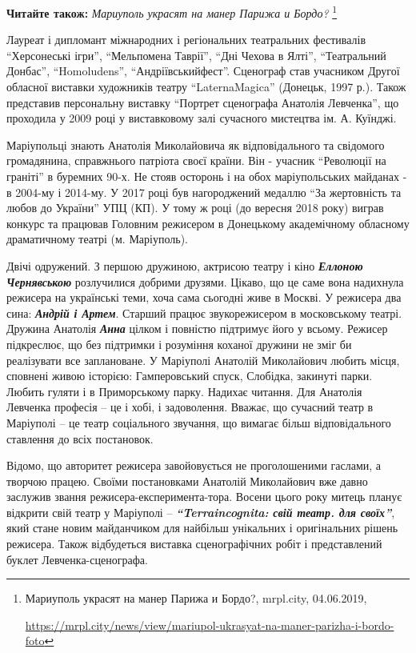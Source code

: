 \textbf{Читайте також:} \emph{Мариуполь украсят на манер Парижа и Бордо?}%
\footnote{Мариуполь украсят на манер Парижа и Бордо?, mrpl.city, 04.06.2019, \par%
\url{https://mrpl.city/news/view/mariupol-ukrasyat-na-maner-parizha-i-bordo-foto}%
}

Лауреат і дипломант міжнародних і регіональних театральних фестивалів
\enquote{Херсонеські ігри}, \enquote{Мельпомена Таврії}, \enquote{Дні Чехова в
Ялті}, \enquote{Театральний Донбас}, \enquote{Homoludens},
\enquote{Андріївськийфест}. Сценограф став учасником Другої обласної виставки
художників театру \enquote{LaternaMagica} (Донецьк, 1997 р.). Також представив
персональну виставку \enquote{Портрет сценографа Анатолія Левченка}, що
проходила у 2009 році у виставковому залі сучасного мистецтва ім. А. Куїнджі.


Маріупольці знають Анатолія Миколайовича як відповідального та свідомого
громадянина, справжнього патріота своєї країни. Він - учасник
\enquote{Революції на граніті} в буремних 90-х. Не стояв осторонь і на обох
маріупольських майданах - в 2004-му і 2014-му. У 2017 році був нагороджений
медаллю \enquote{За жертовність та любов до України} УПЦ (КП). У тому ж році
(до вересня 2018 року) виграв конкурс та працював Головним режисером в
Донецькому академічному обласному драматичному театрі (м. Маріуполь).


Двічі одружений. З першою дружиною, актрисою театру і кіно \emph{\textbf{Еллоною Чернявською}}
розлучилися добрими друзями. Цікаво, що це саме вона надихнула режисера на
українські теми, хоча сама сьогодні живе в Москві. У режисера два сина: \emph{\textbf{Андрій
і Артем}}. Старший працює звукорежисером в московському театрі. Дружина Анатолія
\emph{\textbf{Анна}} цілком і повністю підтримує його у всьому. Режисер підкреслює, що без
підтримки і розуміння коханої дружини не зміг би реалізувати все заплановане. У
Маріуполі Анатолій Миколайович любить місця, сповнені живою історією:
Гамперовський спуск, Слобідка, закинуті парки. Любить гуляти і в Приморському
парку. Надихає читання. Для Анатолія Левченка професія – це і хобі, і
задоволення. Вважає, що сучасний театр в Маріуполі – це театр соціального
звучання, що вимагає більш відповідального ставлення до всіх постановок.

Відомо, що авторитет режисера завойовується не проголошеними гаслами, а творчою
працею. Своїми постановками Анатолій Миколайович вже давно заслужив звання
режисера-експеримента\hyp{}тора. Восени цього року митець планує відкрити свій театр
у Маріуполі – \textbf{\emph{\enquote{Terraincognita: свій театр. для своїх}}}, який стане новим
майданчиком для найбільш унікальних і оригінальних рішень режисера. Також
відбудеться виставка сценографічних робіт і представлений буклет
Левченка-сценографа.

